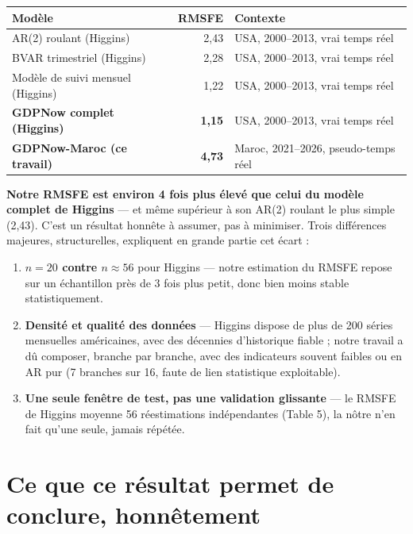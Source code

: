 \documentclass[11pt,a4paper]{article}
\begin{document}
\begin{center}
\small
\begin{tabular}{lrl}
\toprule
\textbf{Modèle} & \textbf{RMSFE} & \textbf{Contexte} \\
\midrule
AR(2) roulant (Higgins) & 2,43 & USA, 2000--2013, vrai temps réel \\
BVAR trimestriel (Higgins) & 2,28 & USA, 2000--2013, vrai temps réel \\
Modèle de suivi mensuel (Higgins) & 1,22 & USA, 2000--2013, vrai temps réel \\
\textbf{GDPNow complet (Higgins)} & \textbf{1,15} & USA, 2000--2013, vrai temps réel \\
\midrule
\textbf{GDPNow-Maroc (ce travail)} & \textbf{4,73} & Maroc, 2021--2026, pseudo-temps réel \\
\bottomrule
\end{tabular}
\end{center}

\begin{alertebox}
\textbf{Notre RMSFE est environ 4 fois plus élevé que celui du modèle complet de Higgins} --- et même supérieur à son AR(2) roulant le plus simple (2,43). C'est un résultat honnête à assumer, pas à minimiser. Trois différences majeures, structurelles, expliquent en grande partie cet écart :
\begin{enumerate}[leftmargin=1.4em]
\item \textbf{$n=20$ contre $n\approx56$} pour Higgins --- notre estimation du RMSFE repose sur un échantillon près de 3 fois plus petit, donc bien moins stable statistiquement.
\item \textbf{Densité et qualité des données} --- Higgins dispose de plus de 200 séries mensuelles américaines, avec des décennies d'historique fiable ; notre travail a dû composer, branche par branche, avec des indicateurs souvent faibles ou en AR pur (7 branches sur 16, faute de lien statistique exploitable).
\item \textbf{Une seule fenêtre de test, pas une validation glissante} --- le RMSFE de Higgins moyenne 56 réestimations indépendantes (Table 5), la nôtre n'en fait qu'une seule, jamais répétée.
\end{enumerate}
\end{alertebox}

\section{Ce que ce résultat permet de conclure, honnêtement}
\end{document}
